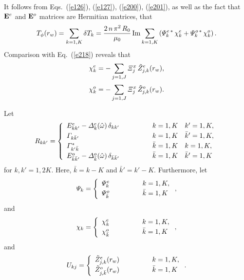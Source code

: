 \documentclass[12pt,prb,aps,notitlepage]{revtex4-1}
\begin{document}
It follows from Eqs.~(\ref{e126}), (\ref{e127}), (\ref{e200}), (\ref{e201}), as well as the fact that ${\bf E}^{e}$ and ${\bf E}^o$
matrices  are Hermitian matrices, that
\begin{equation}\label{e215x}
T_\phi(r_w) = \sum_{k=1,K} \delta T_k=\frac{2\,n\,\pi^2\,R_0}{\mu_0}\,{\rm Im}\sum_{k=1,K} \left({\mit\Psi}_k^{e\,\ast}\,\chi_k^e+ {\mit\Psi}_k^{o\,\ast}\,\chi_k^o\right).
\end{equation}
Comparison with Eq.~(\ref{e218}) reveals that
\begin{align}\label{e216x}
\chi_k^e &=- \sum_{j=1,J}{\mit\Xi}_j^x\,\tilde{Z}_{j,k}^e(r_w),\\[0.5ex]
\chi_k^o &=- \sum_{j=1,J}{\mit\Xi}_j^x\,\tilde{Z}_{j,k}^o(r_w).\label{e217x}
\end{align}

Let 
\begin{equation}
R_{kk'} = \left\{\begin{array}{lll}
E_{kk'}^e - {\mit\Delta}_k^e(\hat{\omega})\,\delta_{kk'}&\mbox{\hspace{1cm}}&k=1,K~~~k'=1,K,\\[0.5ex]
{\mit\Gamma}_{k\bar{k}'} &&k=1,K~~~\bar{k}'=1,K,\\[0.5ex]
{\mit\Gamma}^\ast_{k'\bar{k}}&&\bar{k}=1,K~~~k=1,K,\\[0.5ex]
E^o_{\bar{k}\bar{k}'}-{\mit\Delta}^o_{\bar{k}}(\hat{\omega})\,\delta_{\bar{k}\bar{k}'}&&\bar{k}=1,K~~~\bar{k}'=1,K
\end{array}
\right.
\end{equation}
for $k,k'=1,2K$. Here, $\bar{k}=k-K$ and $\bar{k}'=k'-K$. Furthermore, let
\begin{equation}
{\mit\Psi}_{k} = \left\{\begin{array}{lll}
{\mit\Psi}_k^e&\mbox{\hspace{1cm}}&k=1,K,\\[0.5ex]
{\mit\Psi}_{\bar{k}}^o &&\bar{k}=1,K
\end{array}
\right.,
\end{equation}
and
\begin{equation}
{\chi}_{k} = \left\{\begin{array}{lll}
{\chi}_k^e&\mbox{\hspace{1cm}}&k=1,K,\\[0.5ex]
{\chi}_{\bar{k}}^o &&\bar{k}=1,K
\end{array}
\right.,
\end{equation}
and 
\begin{equation}
U_{kj}= \left\{\begin{array}{lll}
\tilde{Z}^e_{j,k}(r_w)&\mbox{\hspace{1cm}}&k=1,K,\\[0.5ex]
\tilde{Z}^o_{j,\bar{k}}(r_w)&&\bar{k}=1,K
\end{array}
\right..
\end{equation}
\end{document}
